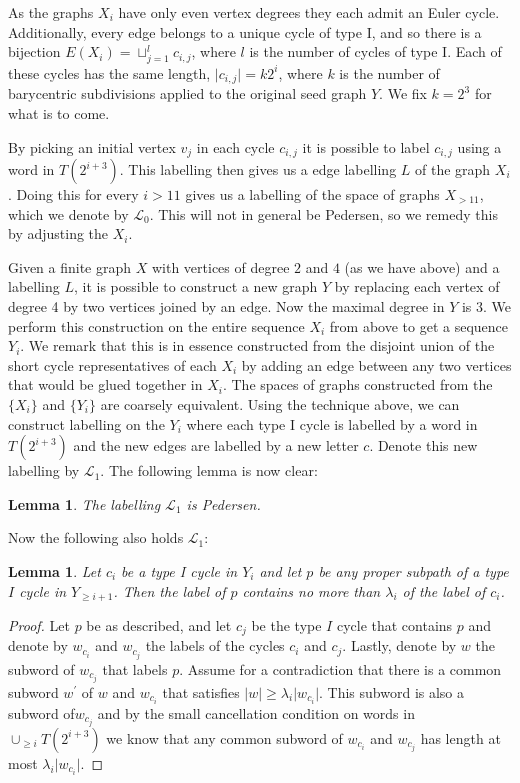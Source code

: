 \documentclass[11pt,a4paper]{amsart}
\theoremstyle{plain}
\newtheorem{lemma}[theorem]{Lemma}%
\theoremstyle{definition}%
\theoremstyle{remark}%
\begin{document}
As the graphs $X_{i}$ have only even vertex degrees they each admit an Euler cycle. Additionally, every edge belongs to a unique cycle of type I, and so there is a bijection $E(X_{i}) = \sqcup_{j=1}^{l} c_{i,j}$, where $l$ is the number of cycles of type I. Each of these cycles has the same length, $\vert c_{i,j} \vert = k2^{i}$, where $k$ is the number of barycentric subdivisions applied to the original seed graph $Y$. We fix $k=2^{3}$ for what is to come.

By picking an initial vertex $v_{j}$ in each cycle $c_{i,j}$ it is possible to label $c_{i,j}$ using a word in $T(2^{i+3})$. This labelling then gives us a edge labelling $L$ of the graph $X_{i}$. Doing this for every $i>11$ gives us a labelling of the space of graphs $X_{>11}$, which we denote by $\mathcal{L}_{0}$. This will not in general be Pedersen, so we remedy this by adjusting the $X_{i}$.

Given a finite graph $X$ with vertices of degree $2$ and $4$ (as we have above) and a labelling $L$, it is possible to construct a new graph $Y$ by replacing each vertex of degree 4 by two vertices joined by an edge. Now the maximal degree in $Y$ is $3$. We perform this construction on the entire sequence $X_{i}$ from above to get a sequence $Y_{i}$. We remark that this is in essence constructed from the disjoint union of the short cycle representatives of each $X_{i}$ by adding an edge between any two vertices that would be glued together in $X_{i}$. The spaces of graphs constructed from the $\lbrace X_{i} \rbrace$ and $\lbrace Y_{i} \rbrace$ are coarsely equivalent. Using the technique above, we can construct labelling on the $Y_{i}$ where each type I cycle is labelled by a word in $T(2^{i+3})$ and the new edges are labelled by a new letter $c$. Denote this new labelling by $\mathcal{L}_{1}$. The following lemma is now clear:

\begin{lemma}\label{lem:modpedersen}
The labelling $\mathcal{L}_{1}$ is Pedersen. 
\end{lemma}

Now the following also holds $\mathcal{L}_{1}$:

\begin{lemma}\label{lem:shortcoherent}
Let $c_{i}$ be a type I cycle in $Y_{i}$ and let $p$ be any proper subpath of a type $I$ cycle in $Y_{\geq i+1}$. Then the label of $p$ contains no more than $\lambda_{i}$ of the label of $c_{i}$. 
\end{lemma}
\begin{proof}
Let $p$ be as described, and let $c_{j}$ be the type $I$ cycle that contains $p$ and denote by $w_{c_{i}}$ and $w_{c_{j}}$ the labels of the cycles $c_{i}$ and $c_{j}$. Lastly, denote by $w$ the subword of $w_{c_{j}}$ that labels $p$. Assume for a contradiction that there is a common subword $w^{'}$ of $w$ and $w_{c_{i}}$ that satisfies $\vert w\vert \geq\lambda_{i} \vert w_{c_{i}} \vert$. This subword is also a subword of$w_{c_{j}}$ and by the small cancellation condition on words in $\cup_{\geq i} T(2^{i+3})$ we know that any common subword of $w_{c_{i}}$ and $w_{c_{j}}$ has length at most $\lambda_{i} \vert w_{c_{i}} \vert$. 
\end{proof}
\end{document}

